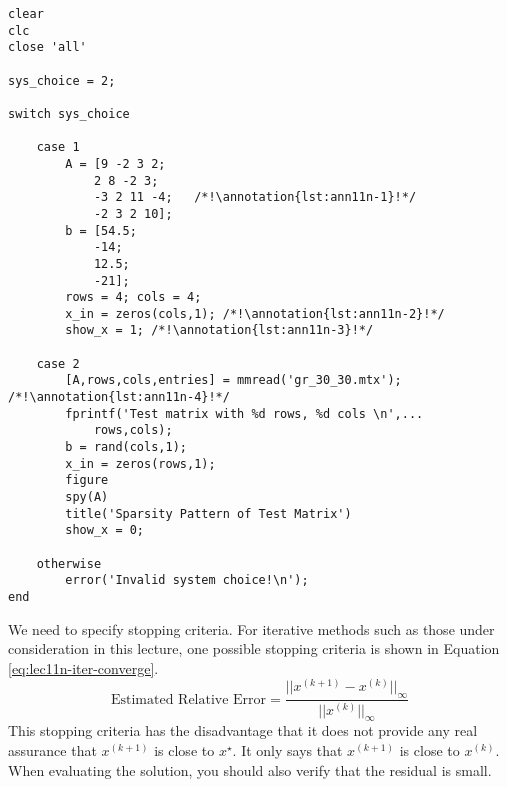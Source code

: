 \begin{lstlisting}[name=lec11n_jacobi, style=myMatlab]
%% Example: Jacobi Method Demonstration
clear
clc
close 'all'

sys_choice = 2;

switch sys_choice
    
    case 1
        A = [9 -2 3 2;
            2 8 -2 3;
            -3 2 11 -4;   /*!\annotation{lst:ann11n-1}!*/
            -2 3 2 10];
        b = [54.5;
            -14;
            12.5;
            -21];
        rows = 4; cols = 4;
        x_in = zeros(cols,1); /*!\annotation{lst:ann11n-2}!*/
        show_x = 1; /*!\annotation{lst:ann11n-3}!*/
           
    case 2
        [A,rows,cols,entries] = mmread('gr_30_30.mtx'); /*!\annotation{lst:ann11n-4}!*/
        fprintf('Test matrix with %d rows, %d cols \n',...
            rows,cols);
        b = rand(cols,1);
        x_in = zeros(rows,1);
        figure
        spy(A)
        title('Sparsity Pattern of Test Matrix')
        show_x = 0;

    otherwise
        error('Invalid system choice!\n');
end
\end{lstlisting}

We need to specify stopping criteria.  For iterative methods such as those under consideration in this lecture, one possible stopping criteria is shown in Equation \ref{eq:lec11n-iter-converge}.
\begin{equation}
\text{Estimated Relative Error} = \frac{|| x^{(k+1)} - x^{(k)}||_{\infty}}{||x^{(k)}||_{\infty}}
\label{eq:lec11n-iter-converge}
\end{equation}
This stopping criteria has the disadvantage that it does not provide any real assurance that $x^{(k+1)}$ is close to $x^{\star}$.  It only says that $x^{(k+1)}$ is close to $x^{(k)}$.  When evaluating the solution, you should also verify that the residual is small.

